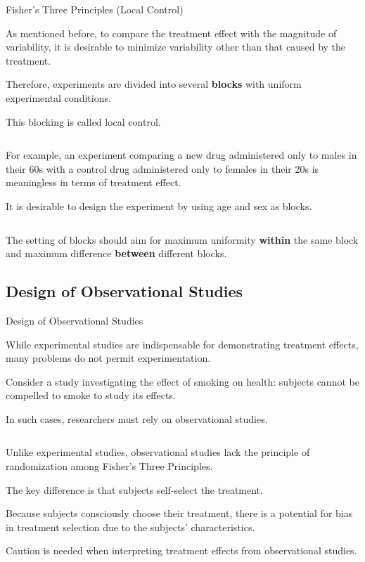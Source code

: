 \documentclass[dvipdfmx, autodetect-engine, aspectratio=169, 10.5pt]{beamer}
\begin{document}
\begin{frame}{Fisher's Three Principles (Local Control)}

	As mentioned before, to compare the treatment effect with the magnitude of variability, it is desirable to minimize variability other than that caused by the treatment.

	Therefore, experiments are divided into several \textbf{blocks} with uniform experimental conditions.

	This blocking is called local control.

	${}$

	For example, an experiment comparing a new drug administered only to males in their 60s with a control drug administered only to females in their 20s is meaningless in terms of treatment effect.

	It is desirable to design the experiment by using age and sex as blocks.

	${}$

	The setting of blocks should aim for maximum uniformity \textbf{within} the same block and maximum difference \textbf{between} different blocks.


\end{frame}

\subsection{Design of Observational Studies}

\begin{frame}{Design of Observational Studies}

	While experimental studies are indispensable for demonstrating treatment effects, many problems do not permit experimentation.

	Consider a study investigating the effect of smoking on health: subjects cannot be compelled to smoke to study its effects.

	In such cases, researchers must rely on observational studies.

	${}$

	Unlike experimental studies, observational studies lack the principle of randomization among Fisher's Three Principles.

	The key difference is that subjects self-select the treatment.

	Because subjects consciously choose their treatment, there is a potential for bias in treatment selection due to the subjects' characteristics.

	Caution is needed when interpreting treatment effects from observational studies.


\end{frame}
\end{document}
